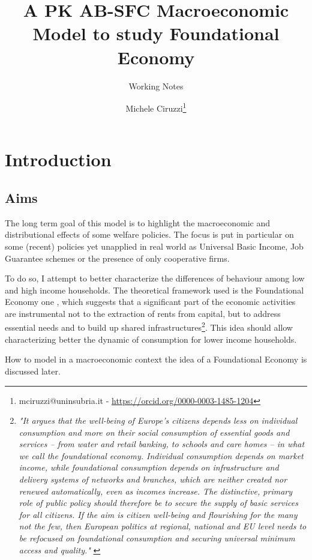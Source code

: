 \documentclass[a4paper, headings=standardclasses]{scrartcl}
\title{A PK AB-SFC Macroeconomic Model to study Foundational Economy\let\thefootnote\relax\footnotetext{
	An updated version of this paper and all the source code and the instructions required to replicate the paper are available at \url{https://github.com/TnTo/FE/}

	\hl{Highlighted} parts of the text indicate substantial choices to be taken.
  }}
\subtitle{Working Notes}
\author{Michele Ciruzzi\thanks{mciruzzi@uninsubria.it - \url{https://orcid.org/0000-0003-1485-1204}}}
\begin{document}
\maketitle


\section{Introduction}
\subsection{Aims}
The long term goal of this model is to highlight the macroeconomic and distributional effects of some welfare policies.
The focus is put in particular on some (recent) policies yet unapplied in real world as Universal Basic Income, Job Guarantee schemes or the presence of only cooperative firms.

To do so, I attempt to better characterize the differences of behaviour among low and high income households.
The theoretical framework used is the Foundational Economy one \parencite{arcidiacono2018}, which suggests that a significant part of the economic activities are instrumental not to the extraction of rents from capital, but to address essential needs and to build up shared infrastructures\footnote{\textit{"It argues that the well-being of Europe's citizens depends less on individual consumption and more on their social consumption of essential goods and services – from water and retail banking, to schools and care homes – in what we call the foundational economy. Individual consumption depends on market income, while foundational consumption depends on infrastructure and delivery systems of networks and branches, which are neither created nor renewed automatically, even as incomes increase. The distinctive, primary role of public policy should therefore be to secure the supply of basic services for all citizens. If the aim is citizen well-being and flourishing for the many not the few, then European politics at regional, national and EU level needs to be refocused on foundational consumption and securing universal minimum access and quality."} \parencite{arcidiacono2018}}.
This idea should allow characterizing better the dynamic of consumption for lower income households.

How to model in a macroeconomic context the idea of a Foundational Economy is discussed later.
\end{document}
